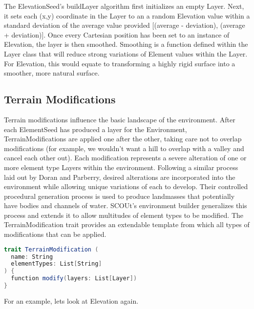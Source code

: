 The ElevationSeed’s buildLayer algorithm first initializes an empty Layer.
Next, it sets each (x,y) coordinate in the Layer to an a random Elevation value within a standard deviation of the average value provided [(average - deviation), (average + deviation)].
Once every Cartesian position has been set to an instance of Elevation, the layer is then smoothed.
Smoothing is a function defined within the Layer class that will reduce strong variations of Element values within the Layer.
For Elevation, this would equate to transforming a highly rigid surface into a smoother, more natural surface.



\subsection{Terrain Modifications}
Terrain modifications influence the basic landscape of the environment.
After each ElementSeed has produced a layer for the Environment, TerrainModifications are applied one after the other, taking care not to overlap modifications (for example, we wouldn't want a hill to overlap with a valley and cancel each other out).
Each modification represents a severe alteration of one or more element type Layers within the environment.
Following a similar process laid out by Doran and Parberry\cite{doran_controlled_2010}, desired alterations are incorporated into the environment while allowing unique variations of each to develop.
Their controlled procedural generation process is used to produce landmasses that potentially have bodies and channels of water.
SCOUt's environment builder generalizes this process and extends it to allow multitudes of element types to be modified.
The TerrainModification trait provides an extendable template from which all types of modifications that can be applied.

\begin{lstlisting}[language=Scala]
trait TerrainModification (
  name: String
  elementTypes: List[String]
) {
  function modify(layers: List[Layer])
}
\end{lstlisting}


For an example, lets look at Elevation again.

